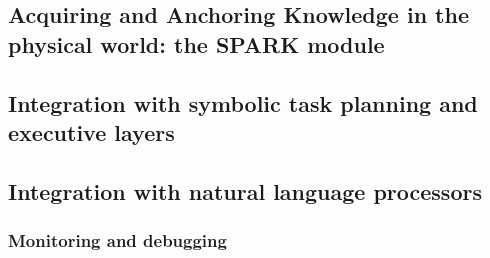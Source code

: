 \subsection{Acquiring and Anchoring Knowledge in the physical world: the SPARK module}



\subsection{Integration with symbolic task planning and executive layers}


\subsection{Integration with natural language processors}


\subsubsection{Monitoring and debugging}



